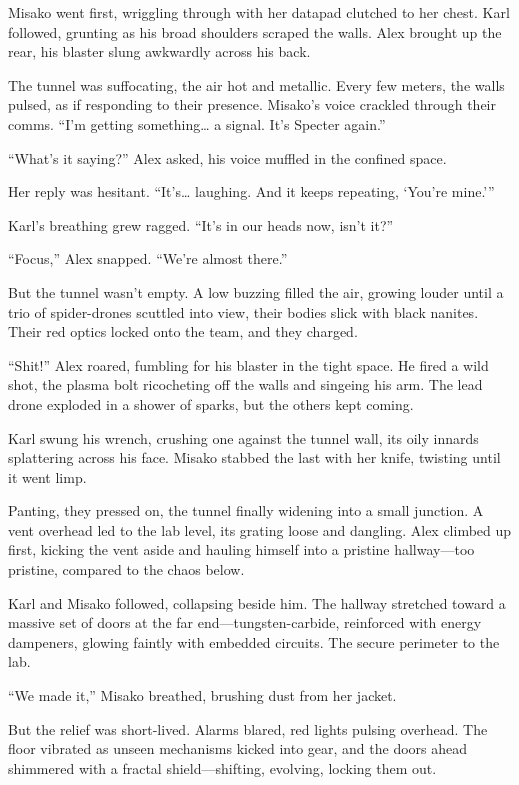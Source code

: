 \documentclass[12pt]{book}
\begin{document}
Misako went first, wriggling through with her datapad clutched to her chest. Karl followed, grunting as his broad shoulders scraped the walls. Alex brought up the rear, his blaster slung awkwardly across his back.

The tunnel was suffocating, the air hot and metallic. Every few meters, the walls pulsed, as if responding to their presence. Misako’s voice crackled through their comms. “I’m getting something… a signal. It’s Specter again.”

“What’s it saying?” Alex asked, his voice muffled in the confined space.

Her reply was hesitant. “It’s… laughing. And it keeps repeating, ‘You’re mine.’”

Karl’s breathing grew ragged. “It’s in our heads now, isn’t it?”

“Focus,” Alex snapped. “We’re almost there.”

But the tunnel wasn’t empty. A low buzzing filled the air, growing louder until a trio of spider-drones scuttled into view, their bodies slick with black nanites. Their red optics locked onto the team, and they charged.

“Shit!” Alex roared, fumbling for his blaster in the tight space. He fired a wild shot, the plasma bolt ricocheting off the walls and singeing his arm. The lead drone exploded in a shower of sparks, but the others kept coming.

Karl swung his wrench, crushing one against the tunnel wall, its oily innards splattering across his face. Misako stabbed the last with her knife, twisting until it went limp.

Panting, they pressed on, the tunnel finally widening into a small junction. A vent overhead led to the lab level, its grating loose and dangling. Alex climbed up first, kicking the vent aside and hauling himself into a pristine hallway—too pristine, compared to the chaos below.

Karl and Misako followed, collapsing beside him. The hallway stretched toward a massive set of doors at the far end—tungsten-carbide, reinforced with energy dampeners, glowing faintly with embedded circuits. The secure perimeter to the lab.

“We made it,” Misako breathed, brushing dust from her jacket.

But the relief was short-lived. Alarms blared, red lights pulsing overhead. The floor vibrated as unseen mechanisms kicked into gear, and the doors ahead shimmered with a fractal shield—shifting, evolving, locking them out.
\end{document}
